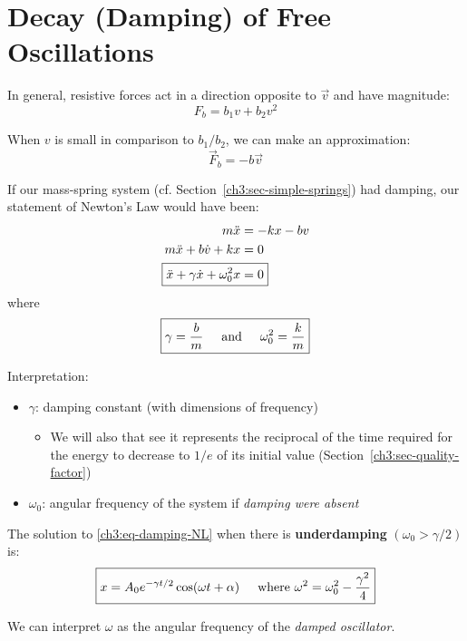 \section{Decay (Damping) of Free Oscillations}	

In general, resistive forces act in a direction opposite to $\vec{v}$ and have magnitude:
\[ F_b = b_1v + b_2v^2\]

When $v$ is small in comparison to $b_1/b_2$, we can make an approximation:
\begin{equation*}
	\boxed{\vec{F}_b = -b\vec{v}}
\end{equation*}

If our mass-spring system (cf. Section~\ref{ch3:sec-simple-springs}) had damping, our statement of Newton's Law would have been:
\begin{align}
	m\ddot{x} &= -kx - bv \notag \\
	m\ddot{x} + b\dot{v} + kx &= 0 \notag  \\
	\Aboxed{\ddot{x} + \gamma \dot{x} + \omega_0^2 x &= 0} \label{ch3:eq-damping-NL}
\end{align}
where
\[ \boxed{\gamma = \frac{b}{m} \hspace{0.5cm}\text{and}\hspace{0.5cm} \omega_0^2 = \frac{k}{m}} \]

Interpretation:
\begin{itemize}
	\item $\gamma$: damping constant (with dimensions of frequency)
	\begin{itemize}
		\item We will also that see it represents the reciprocal of the time required for the energy to decrease to $1/e$ of its initial value (Section~\ref{ch3:sec-quality-factor})
	\end{itemize}
	\item $\omega_0$: angular frequency of the system if \emph{damping were absent}
\end{itemize}

The solution to \eqref{ch3:eq-damping-NL} when there is \textbf{underdamping} $(\omega_0>\gamma/2)$ is:
\begin{equation}
	\boxed{
		x = A_0 e^{-\gamma t/2} \cos(\omega t + \alpha) \hspace{0.5cm}\text{where } \omega ^2 = \omega_0^2 - \frac{\gamma^2}{4} 
	}	\label{ch3:eq-damping-solution}
\end{equation}

We can interpret $\omega$ as the angular frequency of the \emph{damped oscillator}.


